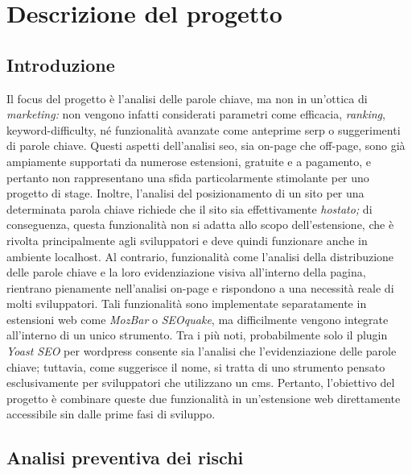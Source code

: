 \chapter{Descrizione del progetto}
\label{cap:descrizione-progetto}


\section{Introduzione}
\label{sec:introduzione-progetto}

\par Il focus del progetto è l’analisi delle parole chiave, ma non in un’ottica di \textit{marketing:} non vengono infatti considerati parametri come efficacia, \textit{ranking}, \gls{keyword-difficulty}, né funzionalità avanzate come anteprime \gls{serp} o suggerimenti di parole chiave. Questi aspetti dell’analisi \gls{seo}, sia \gls{on-page} che \gls{off-page}, sono già ampiamente supportati da numerose estensioni, gratuite e a pagamento, e pertanto non rappresentano una sfida particolarmente stimolante per uno progetto di stage. Inoltre, l’analisi del posizionamento di un sito per una determinata parola chiave richiede che il sito sia effettivamente \textit{hostato;} di conseguenza, questa funzionalità non si adatta allo scopo dell’estensione, che è rivolta principalmente agli sviluppatori e deve quindi funzionare anche in ambiente \gls{localhost}. Al contrario, funzionalità come l’analisi della distribuzione delle parole chiave e la loro evidenziazione visiva all’interno della pagina, rientrano pienamente nell’analisi on-page e rispondono a una necessità reale di molti sviluppatori. Tali funzionalità sono implementate separatamente in estensioni web come \textit{MozBar} o \textit{SEOquake}, ma difficilmente vengono integrate all’interno di un unico strumento. Tra i più noti, probabilmente solo il plugin \textit{Yoast SEO} per \gls{wordpress} consente sia l’analisi che l’evidenziazione delle parole chiave; tuttavia, come suggerisce il nome, si tratta di uno strumento pensato esclusivamente per sviluppatori che utilizzano un \gls{cms}. Pertanto, l’obiettivo del progetto è combinare queste due funzionalità in un’estensione web direttamente accessibile sin dalle prime fasi di sviluppo.

\section{Analisi preventiva dei rischi}
\label{sec:rischi}

